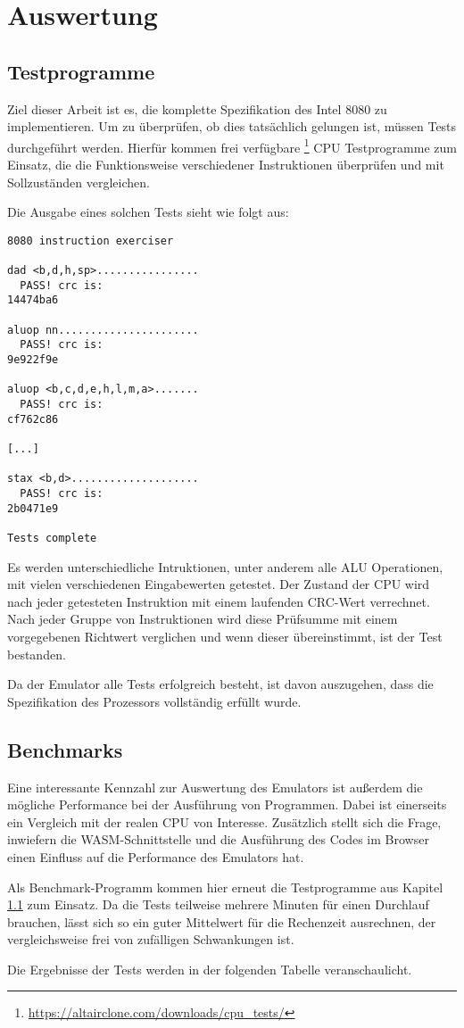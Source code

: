 \chapter{Auswertung}\label{chap:eval}

\section{Testprogramme}\label{sec:tests}

Ziel dieser Arbeit ist es, die komplette Spezifikation des Intel 8080 zu implementieren. Um zu überprüfen, ob dies tatsächlich gelungen ist, müssen Tests durchgeführt werden. Hierfür kommen frei verfügbare \footnote[1]{\url{https://altairclone.com/downloads/cpu_tests/}} CPU Testprogramme zum Einsatz, die die Funktionsweise verschiedener Instruktionen überprüfen und mit Sollzuständen vergleichen.

Die Ausgabe eines solchen Tests sieht wie folgt aus:

\begin{verbatim}
8080 instruction exerciser

dad <b,d,h,sp>................
  PASS! crc is:
14474ba6

aluop nn......................
  PASS! crc is:
9e922f9e

aluop <b,c,d,e,h,l,m,a>.......
  PASS! crc is:
cf762c86

[...]

stax <b,d>....................
  PASS! crc is:
2b0471e9

Tests complete
\end{verbatim}

Es werden unterschiedliche Intruktionen, unter anderem alle \ac{ALU} Operationen, mit vielen verschiedenen Eingabewerten getestet. Der Zustand der \ac{CPU} wird nach jeder getesteten Instruktion mit einem laufenden \ac{CRC}-Wert verrechnet. Nach jeder Gruppe von Instruktionen wird diese Prüfsumme mit einem vorgegebenen Richtwert verglichen und wenn dieser übereinstimmt, ist der Test bestanden.

Da der Emulator alle Tests erfolgreich besteht, ist davon auszugehen, dass die Spezifikation des Prozessors vollständig erfüllt wurde.

\section{Benchmarks}

Eine interessante Kennzahl zur Auswertung des Emulators ist außerdem die mögliche Performance bei der Ausführung von Programmen. Dabei ist einerseits ein Vergleich mit der realen \ac{CPU} von Interesse. Zusätzlich stellt sich die Frage, inwiefern die \ac{WASM}-Schnittstelle und die Ausführung des Codes im Browser einen Einfluss auf die Performance des Emulators hat.

Als Benchmark-Programm kommen hier erneut die Testprogramme aus Kapitel \ref{sec:tests} zum Einsatz. Da die Tests teilweise mehrere Minuten für einen Durchlauf brauchen, lässt sich so ein guter Mittelwert für die Rechenzeit ausrechnen, der vergleichsweise frei von zufälligen Schwankungen ist.

Die Ergebnisse der Tests werden in der folgenden Tabelle veranschaulicht.